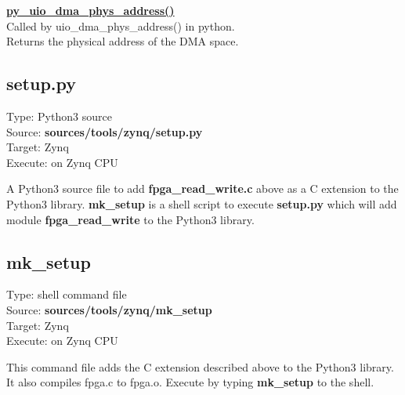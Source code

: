             \underline{{\bf py\_uio\_dma\_phys\_address()}} \\

                Called by uio\_dma\_phys\_address() in python.\\
                Returns the physical address of the DMA space.



        \subsection{setup.py}

            Type: Python3 source\\        
            Source: {\bf sources/tools/zynq/setup.py}\\
            Target: Zynq\\
            Execute: on Zynq CPU

            A Python3 source file to add {\bf fpga\_read\_write.c} above as a C
            extension to the Python3 library. {\bf mk\_setup} is a shell
            script to execute {\bf setup.py} which will add module {\bf
            fpga\_read\_write} to the Python3 library.

        \subsection{mk\_setup}

            Type: shell command file\\        
            Source: {\bf sources/tools/zynq/mk\_setup}\\
            Target: Zynq\\
            Execute: on Zynq CPU

            This command file adds the C extension described above to the Python3 library.
            It also compiles fpga.c to fpga.o.
            Execute by typing {\bf mk\_setup} to the shell.

